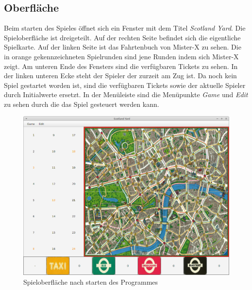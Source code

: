         \subsection{Oberfläche}
            Beim starten des Spieles öffnet sich ein Fenster mit dem Titel \textit{Scotland Yard}.
            Die Spieloberfläche ist dreigeteilt. Auf der rechten Seite befindet sich die eigentliche Spielkarte.
            Auf der linken Seite ist das Fahrtenbuch von Mister-X zu sehen.
            Die in orange gekennzeichneten Spielrunden sind jene Runden indem sich Mister-X zeigt.
            Am unteren Ende des Fensters sind die verfügbaren Tickets zu sehen.
            In der linken unteren Ecke steht der Spieler der zurzeit am Zug ist.
            Da noch kein Spiel gestartet worden ist, sind die verfügbaren Tickets sowie der aktuelle Spieler durch
            Initialwerte ersetzt.
            In der Menüleiste sind die Menüpunkte \textit{Game} und \textit{Edit} zu sehen durch die 
            das Spiel gesteuert werden kann.
            \begin{figure}[H]
                \centering
                \includegraphics[scale=0.3]{img/benutzerhandbuch/programmstart.png}   
                \caption{Spieloberfläche nach starten des Programmes}
                \label{abb_programmstart}
            \end{figure}
           
